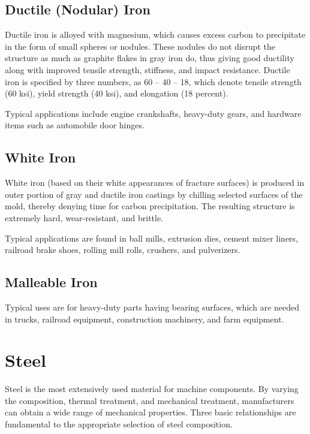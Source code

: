\documentclass[a4paper,openany,12pt]{book}
\begin{document}
\subsection{Ductile (Nodular) Iron}
\label{sec:org694b00a}
Ductile iron is alloyed with magnesium, which causes excess carbon to
precipitate in the form of small spheres or nodules. These nodules do
not disrupt the structure as much as graphite flakes in gray iron do,
thus giving good ductility along with improved tensile strength,
stiffness, and impact resistance. Ductile iron is specified by three
numbers, as 60 -- 40 -- 18, which denote tensile strength (60 ksi),
yield strength (40 ksi), and elongation (18 percent).

Typical applications include engine crankshafts, heavy-duty gears, and
hardware items such as automobile door hinges.

\subsection{White Iron}
\label{sec:orgf12d367}
White iron (based on their white appearances of fracture surfaces) is
produced in outer portion of gray and ductile iron castings by chilling
selected surfaces of the mold, thereby denying time for carbon
precipitation. The resulting structure is extremely hard,
wear-resistant, and brittle.

Typical applications are found in ball mills, extrusion dies, cement
mixer liners, railroad brake shoes, rolling mill rolls, crushers, and
pulverizers.

\subsection{Malleable Iron}
\label{sec:orgbc0a09c}
Typical uses are for heavy-duty parts having bearing surfaces, which are
needed in trucks, railroad equipment, construction machinery, and farm
equipment.

\section{Steel}
\label{sec:orgb6bc39f}
Steel is the most extensively used material for machine components. By
varying the composition, thermal treatment, and mechanical treatment,
manufacturers can obtain a wide range of mechanical properties. Three
basic relationships are fundamental to the appropriate selection of
steel composition.
\end{document}
